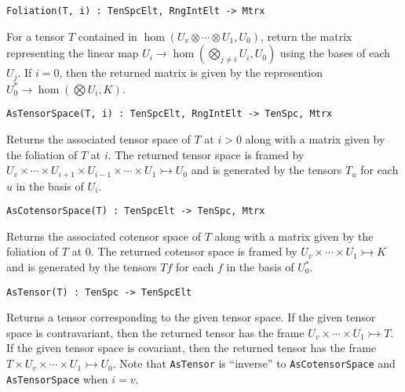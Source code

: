 \color{blue}
{\small \begin{verbatim}
Foliation(T, i) : TenSpcElt, RngIntElt -> Mtrx
\end{verbatim} }
\color{black}

For a tensor $T$ contained in $\hom(U_v\otimes \cdots \otimes U_1,U_0)$,
return the matrix representing the linear map 
$U_i\rightarrow \hom(\bigotimes_{j\ne i}U_i,U_0)$ using the bases of each $U_j$.
If $i=0$, then the returned matrix is given by the represention 
$U_0^*\rightarrow \hom(\bigotimes U_i,K)$.

\color{blue}
{\small \begin{verbatim}
AsTensorSpace(T, i) : TenSpcElt, RngIntElt -> TenSpc, Mtrx
\end{verbatim} }
\color{black}

Returns the associated tensor space of $T$ at $i>0$ along with a matrix given by
the foliation of $T$ at $i$. 
The returned tensor space is framed by 
$U_v\times \cdots \times U_{i+1}\times U_{i-1}\times \cdots \times U_1\rightarrowtail U_0$
and is generated by the tensors $T_u$ for each $u$ in the basis of $U_i$.

\color{blue}
{\small \begin{verbatim}
AsCotensorSpace(T) : TenSpcElt -> TenSpc, Mtrx
\end{verbatim} }
\color{black}

Returns the associated cotensor space of $T$ along with a matrix given by
the foliation of $T$ at $0$. 
The returned cotensor space is framed by 
$U_v\times \cdots \times U_1\rightarrowtail K$
and is generated by the tensors $Tf$ for each $f$ in the basis of $U_0^*$.

\color{blue}
{\small \begin{verbatim}
AsTensor(T) : TenSpc -> TenSpcElt
\end{verbatim} }
\color{black}

Returns a tensor corresponding to the given tensor space. 
If the given tensor space is contravariant, then the returned tensor has the frame $U_v\times \cdots \times U_1\rightarrowtail T$.
If the given tensor space is covariant, then the returned tensor has the frame $T\times U_v\times \cdots \times U_1\rightarrowtail U_0$.
Note that {\tt AsTensor} is ``inverse'' to {\tt AsCotensorSpace} and {\tt AsTensorSpace} when $i=v$.

